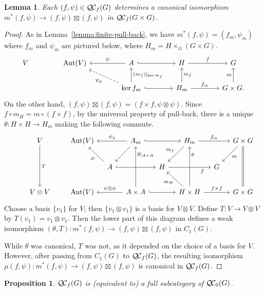 \documentclass[11pt]{amsart}
\theoremstyle{plain}
\newtheorem{proposition}[theorem]{Proposition}
\newtheorem{lemma}[theorem]{Lemma}
\theoremstyle{definition}
\theoremstyle{remark}
\DeclareMathOperator{\Aut}{Aut}
\newcommand{\QC}{{\mathcal{Q\hskip-0.8pt C}}}
\newcommand{\QCb}{{\QC_0}}
\newcommand{\QCf}{{\QC_f}}
\begin{document}
\begin{lemma}\label{lemma:finite-iso}
Each $(f,\psi)\in \QCf(G)$ determines a canonical isomorphism $m^*(f,\psi) \to (f,\psi)\boxtimes(f,\psi)$ in $\QCf(G\times G)$.
 \end{lemma}

\begin{proof}
As in Lemma~\ref{lemma:finite-pull-back}, we have $m^*(f,\psi) = (f_m,\psi_m)$
where $f_m$ and $\psi_m$ are pictured below, where $H_m = H\times_G(G\times G)$.
\[
\begin{tikzcd}[column sep=40]
V & \Aut(V) & \arrow[swap]{l}{\psi} A \arrow[hook]{r} & H \arrow{r}{f} &  G\\
  &  & \arrow[dashed]{ul}{\psi_g} \arrow[swap]{u}{(m_f)\vert_{\ker m_f}} \ker f_m \arrow[hook]{r}
  & \arrow[swap]{u}{m_f} H_m \arrow{r}{f_m} & \arrow{u}{m} G\times G.
\end{tikzcd}
\]
On the other hand, $(f,\psi) \boxtimes (f,\psi) = (f\times f, \psi\otimes \psi)$.
Since $f\circ m_H = m \circ (f\times f)$, by the universal property of pull-back,
there is a unique $\theta : H\times H \to H_m$ making the following commute.
\[
\begin{tikzcd}[row sep=20,column sep=10]
\ & V \arrow{dd}{T} && \Aut(V) && \arrow{dl} \arrow[swap]{ll}{\psi_g} A_m \arrow[hook]{rr}
&& \arrow[swap]{ld}{m_f} H_m \arrow{rr}{f_m} && \arrow[equal]{dd} \arrow{ld}{m} G\times G\\
 && && \arrow{ul}{\psi} A  \arrow[hook]{rr} && H  \arrow[swap, pos=0.8]{rr}{f} && G  & \\
& V\otimes V && \Aut(V)
&& \arrow[swap]{ll}{\psi \otimes \psi} \arrow[swap,pos=0.8]{uu}{\theta\vert_{A\times A}} A\times A \arrow[hook]{rr}
&& \arrow[swap,pos=0.8]{uu}{\theta} \arrow{ul}{m_H} H\times H \arrow{rr}{f\times f} && G\times G
\end{tikzcd}
\]
Choose a basis $\{ v_1 \}$ for $V$; then $\{ v_1\otimes v_1 \}$ is a basis for $V\otimes V$.
Define $T : V \to V\otimes V$ by $T(v_1) = v_1\otimes v_1$. Then the lower part of this
diagram defines a weak isomorphism $(\theta,T): m^*(f,\psi) \to (f,\psi)\boxtimes (f,\psi)$  in $C_1(G)$. 

While $\theta$ was canonical, $T$ was not, as it depended on the choice of a basis for $V$.
However, after passing from $C_1(G)$ to $\QCf(G)$, the resulting isomorphism
$\mu(f,\psi): m^*(f,\psi) \to (f,\psi)\boxtimes (f,\psi)$ is canonical in $\QCf(G)$.
\end{proof}


\begin{proposition}\label{prop:bounded}
 $\QCf(G)$ is (equivalent to) a full subcategory of $\QCb(G)$.
\end{proposition}
\end{document}
